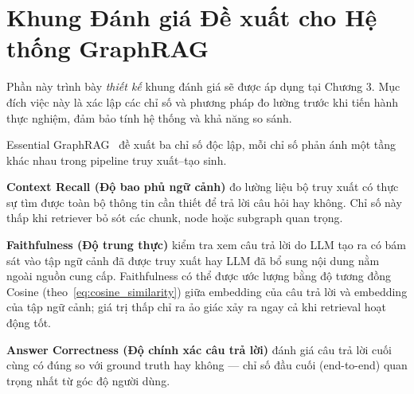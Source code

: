 \documentclass[12pt,a4paper]{report}
\theoremstyle{plain}
\theoremstyle{definition}
\begin{document}
	\section[Khung Đánh giá Đề xuất cho Hệ thống GraphRAG]
	{Khung Đánh giá Đề xuất cho Hệ thống \linebreak GraphRAG}
		
	Phần này trình bày \emph{thiết kế} khung đánh giá sẽ được áp dụng tại
	Chương 3. Mục đích việc này là xác lập các chỉ số và phương pháp
	đo lường trước khi tiến hành thực nghiệm, đảm bảo tính hệ thống và khả năng
	so sánh.
	
	Essential GraphRAG~\cite{neo4j2024essential} đề xuất ba chỉ số độc lập, mỗi
	chỉ số phản ánh một tầng khác nhau trong pipeline truy xuất--tạo sinh.
	
	\textbf{Context Recall (Độ bao phủ ngữ cảnh)} đo lường liệu bộ truy xuất có
	thực sự tìm được toàn bộ thông tin cần thiết để trả lời câu hỏi hay không.
	Chỉ số này thấp khi retriever bỏ sót các chunk, node hoặc subgraph quan trọng.
	
	\textbf{Faithfulness (Độ trung thực)} kiểm tra xem câu trả lời do LLM tạo ra
	có bám sát vào tập ngữ cảnh đã được truy xuất hay LLM đã bổ sung nội dung nằm
	ngoài nguồn cung cấp. Faithfulness có thể được ước lượng bằng độ tương đồng
	Cosine (theo~\eqref{eq:cosine_similarity}) giữa embedding của câu trả lời và
	embedding của tập ngữ cảnh; giá trị thấp chỉ ra ảo giác xảy ra ngay cả khi
	retrieval hoạt động tốt.
	
	\textbf{Answer Correctness (Độ chính xác câu trả lời)} đánh giá câu trả lời
	cuối cùng có đúng so với ground truth hay không --- chỉ số đầu cuối
	(end-to-end) quan trọng nhất từ góc độ người dùng.
	
\end{document}
